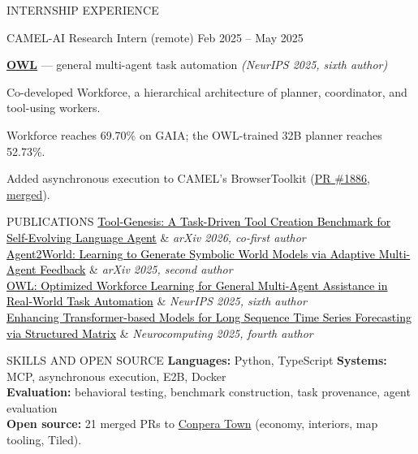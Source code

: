 \documentclass{kyvernitis-resume}
\makeatletter
\newcommand{\lead}[1]{\item[]\hspace{-2em}#1}
\newcommand{\paperrow}[4]{\href{#2}{\textcolor{black}{#1}} & \textit{#3, #4}\\}
\newenvironment{paperlist}{%
  \fontsize{8.8}{13}\selectfont\noindent
  \tabularx{\linewidth}{@{}>{\raggedright\arraybackslash}X@{\hspace{1.5mm}}r@{}}}{%
  \endtabularx\par}
\makeatother
\begin{document}
\begin{section}{INTERNSHIP EXPERIENCE}
  \begin{subsection}
    {CAMEL-AI}
    {Research Intern (remote)}
    {Feb 2025 -- May 2025}
    {}
    \lead{\textbf{\href{https://papers.neurips.cc/paper_files/paper/2025/hash/48dcc43a534c5b582f9d0fdb778e9b84-Abstract-Conference.html}{OWL}} --- general multi-agent task automation \textit{(NeurIPS 2025, sixth author)}}
    \item Co-developed Workforce, a hierarchical architecture of planner, coordinator, and tool-using workers.
    \item Workforce reaches 69.70\% on GAIA; the OWL-trained 32B planner reaches 52.73\%.
    \item Added asynchronous execution to CAMEL's BrowserToolkit (\href{https://github.com/camel-ai/camel/pull/1886}{PR \#1886, merged}).
  \end{subsection}
\end{section}

\begin{section}{PUBLICATIONS}
  \begin{paperlist}
  \paperrow{Tool-Genesis: A Task-Driven Tool Creation Benchmark for Self-Evolving Language Agent}{https://arxiv.org/abs/2603.05578}{arXiv 2026}{co-first author}
  \paperrow{Agent2World: Learning to Generate Symbolic World Models via Adaptive Multi-Agent Feedback}{https://arxiv.org/abs/2512.22336}{arXiv 2025}{second author}
  \paperrow{OWL: Optimized Workforce Learning for General Multi-Agent Assistance in Real-World Task Automation}{https://papers.neurips.cc/paper_files/paper/2025/hash/48dcc43a534c5b582f9d0fdb778e9b84-Abstract-Conference.html}{NeurIPS 2025}{sixth author}
  \paperrow{Enhancing Transformer-based Models for Long Sequence Time Series Forecasting via Structured Matrix}{https://doi.org/10.1016/j.neucom.2025.129429}{Neurocomputing 2025}{fourth author}
  \end{paperlist}
\end{section}

\begin{section}{SKILLS AND OPEN SOURCE}
  \textbf{Languages:} Python, TypeScript \enspace\textbar\enspace \textbf{Systems:} MCP, asynchronous execution, E2B, Docker\\
  \textbf{Evaluation:} behavioral testing, benchmark construction, task provenance, agent evaluation\\
  \textbf{Open source:} 21 merged PRs to \href{https://github.com/conpera/conpera-town/pulls?q=is\%3Apr+author\%3Asubway-jack+is\%3Amerged}{Conpera Town} (economy, interiors, map tooling, Tiled).
\end{section}

\end{document}
